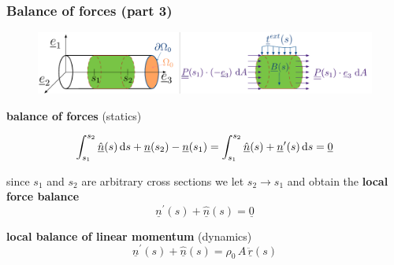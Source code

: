 \begin{frame}
  \frametitle{Balance of forces (part 3)}
  
  \begin{figure}
    \centering
    \includegraphics[width=22cm, keepaspectratio=true]{sections/cosserat_rods/images/Forces}
  \end{figure}
  
  \textbf{balance of forces} (statics)
  
  \begin{displaymath}
    \int_{s_1}^{s_2} \underline{\hat{n}}(s) \dif s + \underline{n}(s_2) - \underline{n}(s_1) =
    \int_{s_1}^{s_2} \underline{\hat{n}}(s) + \underline{n}^{\prime}(s) \dif s =
    \underline{0}
  \end{displaymath}
  
  since $s_1$ and $s_2$ are arbitrary cross sections we let $s_2 \to s_1$ \newline
  and obtain the \textbf{local force balance}
  \begin{displaymath}
    \underline{n}^{\prime}(s) + \underline{\hat{n}}(s) = \underline{0}
  \end{displaymath}
  \vspace{0.6em}
  
  \textbf{local balance of linear momentum} (dynamics)
  \begin{displaymath}
    \underline{n}^{\prime}(s) + \underline{\hat{n}}(s) = \rho_0 \, A \, \underline{\ddot{r}}(s)
  \end{displaymath}
\end{frame}


